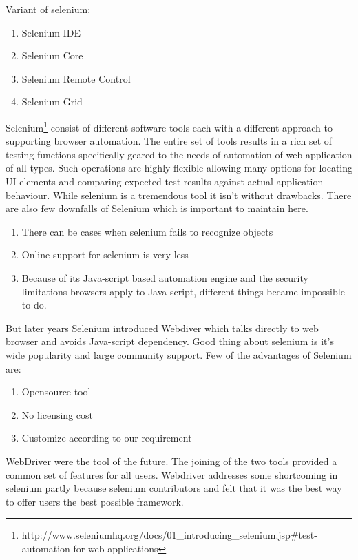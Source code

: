\documentclass[article,type=msc,colorback,accentcolor=tud9c,twoside,11pt]{tudthesis}
\begin{document}
	Variant of selenium:
	\begin{enumerate}
		\item Selenium IDE
		\item Selenium Core
		\item Selenium Remote Control
		\item Selenium Grid
	\end{enumerate}
	
	Selenium\footnote{http://www.seleniumhq.org/docs/01\_introducing\_selenium.jsp\#test-automation-for-web-applications} consist of different software tools each with a different approach to supporting browser automation. The entire set of tools results in a rich set of testing functions specifically geared to the needs of automation of web application of all types. Such operations are highly flexible allowing many options for locating UI elements and comparing expected test results against actual application behaviour. While selenium is a tremendous tool it isn't without drawbacks.
	There are also few downfalls of Selenium which is important to maintain here.
	\begin{enumerate}
		\item	There can be cases when selenium fails to recognize objects
		\item Online support for selenium is very less
		\item Because of its Java-script based automation engine and the security limitations browsers apply to Java-script, different things became impossible to do.
	\end{enumerate}
	But later years Selenium introduced Webdiver which talks directly to web browser and avoids Java-script dependency. Good thing about selenium is it's wide popularity and large community support. Few of the advantages of Selenium are:
	\begin{enumerate}
		\item Opensource tool
		\item No licensing cost
		\item Customize according to our requirement
	\end{enumerate}
	WebDriver were the tool of the future. The joining of the two tools provided a common set of features for all users. Webdriver addresses some shortcoming in selenium partly because selenium contributors and felt that it was the best way to offer users the best possible framework.
\end{document}
